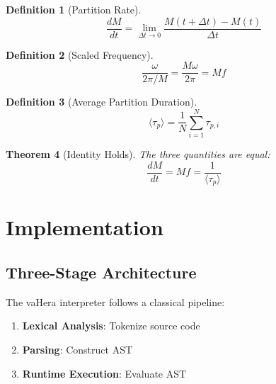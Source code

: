 \documentclass[twocolumn,10pt]{article}
\newtheorem{theorem}{Theorem}[section]
\theoremstyle{definition}
\newtheorem{definition}[theorem]{Definition}
\theoremstyle{remark}
\begin{document}
\begin{definition}[Partition Rate]
\begin{equation}
    \frac{dM}{dt} = \lim_{\Delta t \to 0} \frac{M(t + \Delta t) - M(t)}{\Delta t}
\end{equation}
\end{definition}

\begin{definition}[Scaled Frequency]
\begin{equation}
    \frac{\omega}{2\pi/M} = \frac{M\omega}{2\pi} = Mf
\end{equation}
\end{definition}

\begin{definition}[Average Partition Duration]
\begin{equation}
    \langle\tau_p\rangle = \frac{1}{N} \sum_{i=1}^{N} \tau_{p,i}
\end{equation}
\end{definition}

\begin{theorem}[Identity Holds]
The three quantities are equal:
\begin{equation}
    \frac{dM}{dt} = Mf = \frac{1}{\langle\tau_p\rangle}
\end{equation}
\end{theorem}

\section{Implementation}
\label{sec:implementation}

\subsection{Three-Stage Architecture}

The vaHera interpreter follows a classical pipeline:

\begin{enumerate}
    \item \textbf{Lexical Analysis}: Tokenize source code
    \item \textbf{Parsing}: Construct AST
    \item \textbf{Runtime Execution}: Evaluate AST
\end{enumerate}
\end{document}
